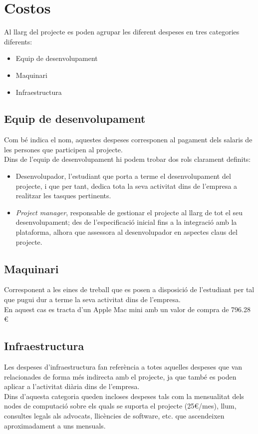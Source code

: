 \section{Costos}
\label{costs}
Al llarg del projecte es poden agrupar les diferent despeses en tres categories diferents:
\begin{itemize}
	\item Equip de desenvolupament
	\item Maquinari
	\item Infraestructura
\end{itemize}

\subsection{Equip de desenvolupament}
Com bé indica el nom, aquestes despeses corresponen al pagament dels salaris de les persones que participen al projecte.\\
Dins de l'equip de desenvolupament hi podem trobar dos rols clarament definits:
\begin{itemize}
	\item Desenvolupador, l'estudiant que porta a terme el desenvolupament del projecte, i que per tant, dedica tota la seva activitat dins de l'empresa a realitzar les tasques pertinents.
	\item \textit{Project manager}, responsable de gestionar el projecte al llarg de tot el seu desenvolupament; des de l'especificació inicial fins a la integració amb la plataforma, alhora que assessora al desenvolupador en aspectes claus del projecte. 
\end{itemize}

\subsection{Maquinari}
Corresponent a les eines de treball que es posen a disposició de l'estudiant per tal que pugui dur a terme la seva activitat dins de l'empresa. \\
En aquest cas es tracta d'un Apple Mac mini amb un valor de compra de 796.28 \euro

\subsection{Infraestructura}
Les despeses d'infraestructura fan referència a totes aquelles despeses que van relacionades de forma més indirecta amb el projecte, ja que també es poden aplicar a l'activitat diària dins de l'empresa.\\
\newline Dins d'aquesta categoria queden incloses despeses tals com la mensualitat dels nodes de computació sobre els quals se suporta el projecte (25\euro/mes), llum, consultes legals als advocats, llicències de software, etc. que ascendeixen aproximadament a uns  mensuals.


